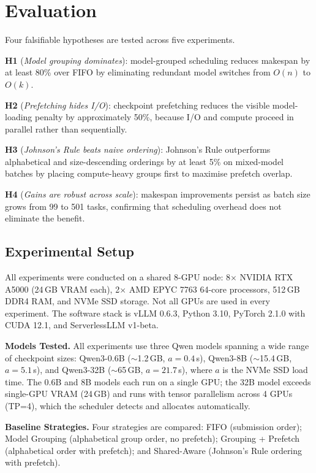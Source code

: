 \documentclass[logo,bsc,singlespacing,parskip,online]{infthesis}
\begin{document}
\chapter{Evaluation}

Four falsifiable hypotheses are tested across five experiments.

\textbf{H1} (\textit{Model grouping dominates}): model-grouped scheduling reduces makespan by at least 80\% over FIFO by eliminating redundant model switches from $O(n)$ to $O(k)$.

\textbf{H2} (\textit{Prefetching hides I/O}): checkpoint prefetching reduces the visible model-loading penalty by approximately 50\%, because I/O and compute proceed in parallel rather than sequentially.

\textbf{H3} (\textit{Johnson's Rule beats naive ordering}): Johnson's Rule outperforms alphabetical and size-descending orderings by at least 5\% on mixed-model batches by placing compute-heavy groups first to maximise prefetch overlap.

\textbf{H4} (\textit{Gains are robust across scale}): makespan improvements persist as batch size grows from 99 to 501 tasks, confirming that scheduling overhead does not eliminate the benefit.


\section{Experimental Setup}

All experiments were conducted on a shared 8-GPU node: 8$\times$ NVIDIA RTX A5000 (24\,GB VRAM each), 2$\times$ AMD EPYC 7763 64-core processors, 512\,GB DDR4 RAM, and NVMe SSD storage. Not all GPUs are used in every experiment. The software stack is vLLM 0.6.3, Python 3.10, PyTorch 2.1.0 with CUDA 12.1, and ServerlessLLM v1-beta.

\textbf{Models Tested.}
All experiments use three Qwen models spanning a wide range of checkpoint sizes: Qwen3-0.6B ($\sim$1.2\,GB, $a=0.4$\,s), Qwen3-8B ($\sim$15.4\,GB, $a=5.1$\,s), and Qwen3-32B ($\sim$65\,GB, $a=21.7$\,s), where $a$ is the NVMe SSD load time. The 0.6B and 8B models each run on a single GPU; the 32B model exceeds single-GPU VRAM (24\,GB) and runs with tensor parallelism across 4 GPUs (TP=4), which the scheduler detects and allocates automatically.

\textbf{Baseline Strategies.}
Four strategies are compared: FIFO (submission order); Model Grouping (alphabetical group order, no prefetch); Grouping + Prefetch (alphabetical order with prefetch); and Shared-Aware (Johnson's Rule ordering with prefetch).
\end{document}
